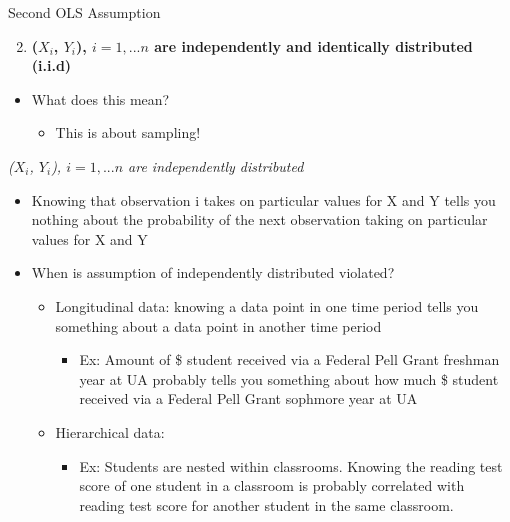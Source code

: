 \documentclass[8pt,ignorenonframetext,dvipsnames]{beamer}
\providecommand{\tightlist}{%
  \setlength{\itemsep}{0pt}\setlength{\parskip}{0pt}}
\renewcommand{\textbf}[1]{{\color{darkgray}\bfseries\fontfamily{Montserrat-TOsF}#1}}
\let\olditem\item
\renewcommand{\item}{%
  \olditem\vspace{4pt}
}
\begin{document}
\begin{frame}{Second OLS Assumption}
\protect\hypertarget{second-ols-assumption}{}

\begin{enumerate}
\setcounter{enumi}{1}
\tightlist
\item
  \textbf{(\(X_i\), \(Y_i\)), \(i=1, ...n\) are independently and
  identically distributed (i.i.d)}
\end{enumerate}

\begin{itemize}
\tightlist
\item
  What does this mean?

  \begin{itemize}
  \tightlist
  \item
    This is about sampling!
  \end{itemize}
\end{itemize}

\medskip

\emph{(\(X_i\), \(Y_i\)), \(i=1, ...n\) are independently distributed}

\begin{itemize}
\tightlist
\item
  Knowing that observation i takes on particular values for X and Y
  tells you nothing about the probability of the next observation taking
  on particular values for X and Y
\item
  When is assumption of independently distributed violated?

  \begin{itemize}
  \tightlist
  \item
    Longitudinal data: knowing a data point in one time period tells you
    something about a data point in another time period

    \begin{itemize}
    \tightlist
    \item
      Ex: Amount of \$ student received via a Federal Pell Grant
      freshman year at UA probably tells you something about how much \$
      student received via a Federal Pell Grant sophmore year at UA
    \end{itemize}
  \item
    Hierarchical data:

    \begin{itemize}
    \tightlist
    \item
      Ex: Students are nested within classrooms. Knowing the reading
      test score of one student in a classroom is probably correlated
      with reading test score for another student in the same classroom.
    \end{itemize}
  \end{itemize}
\end{itemize}

\end{frame}
\end{document}
